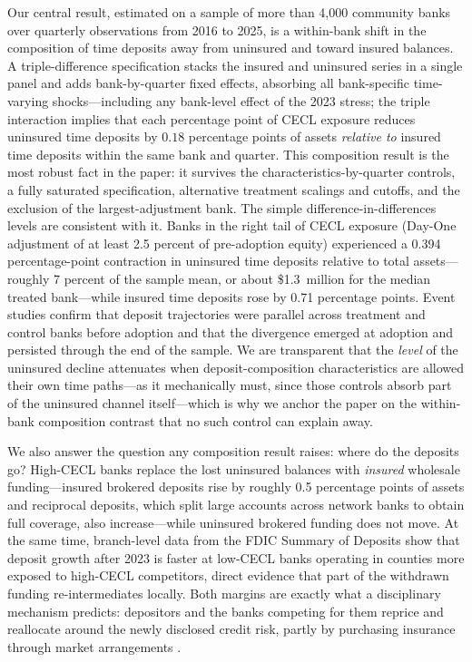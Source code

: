 Our central result, estimated on a sample of more than 4,000 community banks over
quarterly observations from 2016 to 2025, is a within-bank shift in the
composition of time deposits away from uninsured and toward insured balances.  A
triple-difference specification stacks the insured and uninsured series in a
single panel and adds bank-by-quarter fixed effects, absorbing all bank-specific
time-varying shocks---including any bank-level effect of the 2023 stress; the
triple interaction implies that each percentage point of CECL exposure reduces
uninsured time deposits by $0.18$ percentage points of assets \emph{relative to}
insured time deposits within the same bank and quarter.  This composition result
is the most robust fact in the paper: it survives the characteristics-by-quarter
controls, a fully saturated specification, alternative treatment scalings and
cutoffs, and the exclusion of the largest-adjustment bank.  The simple
difference-in-differences levels are consistent with it.  Banks in the right
tail of CECL exposure (Day-One adjustment of at least 2.5 percent of
pre-adoption equity) experienced a 0.394 percentage-point contraction in
uninsured time deposits relative to total assets---roughly 7 percent of the
sample mean, or about \$1.3~million for the median treated bank---while insured
time deposits rose by 0.71 percentage points.  Event studies confirm that
deposit trajectories were parallel across treatment and control banks before
adoption and that the divergence emerged at adoption and persisted through the
end of the sample.  We are transparent that the \emph{level} of the uninsured
decline attenuates when deposit-composition characteristics are allowed their
own time paths---as it mechanically must, since those controls absorb part of
the uninsured channel itself---which is why we anchor the paper on the
within-bank composition contrast that no such control can explain away.

We also answer the question any composition result raises: where do the deposits
go?  High-CECL banks replace the lost uninsured balances with \emph{insured}
wholesale funding---insured brokered deposits rise by roughly 0.5 percentage
points of assets and reciprocal deposits, which split large accounts across
network banks to obtain full coverage, also increase---while uninsured brokered
funding does not move.  At the same time, branch-level data from the FDIC
Summary of Deposits show that deposit growth after 2023 is faster at low-CECL
banks operating in counties more exposed to high-CECL competitors, direct
evidence that part of the withdrawn funding re-intermediates locally.  Both
margins are exactly what a disciplinary mechanism predicts: depositors and the
banks competing for them reprice and reallocate around the newly disclosed
credit risk, partly by purchasing insurance through market arrangements
\citep{kim2024insurance}.

